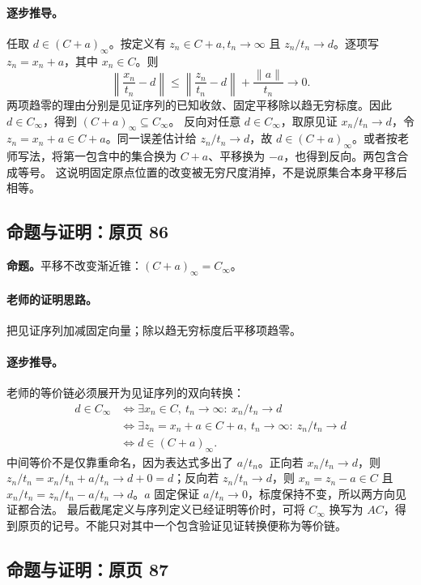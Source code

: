 \documentclass[11pt,a4paper]{article}
\theoremstyle{definition}\newtheorem{definition}{定义}\newtheorem{example}{例}
\begin{document}
\paragraph{逐步推导。}
任取 $d\in(C+a)_\infty$。按定义有 $z_n\in C+a,t_n\to\infty$ 且 $z_n/t_n\to d$。逐项写 $z_n=x_n+a$，其中 $x_n\in C$。则
\[\left\|\frac{x_n}{t_n}-d\right\|\le\left\|\frac{z_n}{t_n}-d\right\|+\frac{\|a\|}{t_n}\to0.\]
两项趋零的理由分别是见证序列的已知收敛、固定平移除以趋无穷标度。因此 $d\in C_\infty$，得到 $(C+a)_\infty\subseteq C_\infty$。
反向对任意 $d\in C_\infty$，取原见证 $x_n/t_n\to d$，令 $z_n=x_n+a\in C+a$。同一误差估计给 $z_n/t_n\to d$，故 $d\in(C+a)_\infty$。或者按老师写法，将第一包含中的集合换为 $C+a$、平移换为 $-a$，也得到反向。两包含合成等号。
这说明固定原点位置的改变被无穷尺度消掉，不是说原集合本身平移后相等。


\subsection{命题与证明：原页 86}

\textbf{命题。}平移不改变渐近锥：$(C+a)_\infty=C_\infty$。

\paragraph{老师的证明思路。}把见证序列加减固定向量；除以趋无穷标度后平移项趋零。

\paragraph{逐步推导。}
老师的等价链必须展开为见证序列的双向转换：
\begin{align*}
d\in C_\infty
&\iff\exists x_n\in C,\ t_n\to\infty:\ x_n/t_n\to d\\
&\iff\exists z_n=x_n+a\in C+a,\ t_n\to\infty:\ z_n/t_n\to d\\
&\iff d\in(C+a)_\infty.
\end{align*}
中间等价不是仅靠重命名，因为表达式多出了 $a/t_n$。正向若 $x_n/t_n\to d$，则 $z_n/t_n=x_n/t_n+a/t_n\to d+0=d$；反向若 $z_n/t_n\to d$，则 $x_n=z_n-a\in C$ 且 $x_n/t_n=z_n/t_n-a/t_n\to d$。$a$ 固定保证 $a/t_n\to0$，标度保持不变，所以两方向见证都合法。
最后截尾定义与序列定义已经证明等价时，可将 $C_\infty$ 换写为 $AC$，得到原页的记号。不能只对其中一个包含验证见证转换便称为等价链。


\subsection{命题与证明：原页 87}
\end{document}
